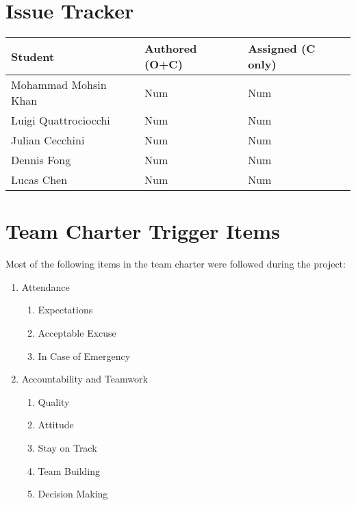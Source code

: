 \documentclass{article}
\begin{document}
\section{Issue Tracker}


\begin{table}[H]
\centering
\begin{tabular}{lll}
\toprule
\textbf{Student} & \textbf{Authored (O+C)} & \textbf{Assigned (C only)}\\
\midrule
Mohammad Mohsin Khan & Num & Num \\
Luigi Quattrociocchi & Num & Num \\
Julian Cecchini & Num & Num \\
Dennis Fong & Num & Num \\
Lucas Chen & Num & Num \\
\bottomrule
\end{tabular}
\end{table}


\section{Team Charter Trigger Items}

Most of the following items in the team charter were followed during the project:
\begin{enumerate}
    \item Attendance
    \begin{enumerate}
        \item Expectations
        \item Acceptable Excuse
        \item In Case of Emergency
    \end{enumerate}
    \item Accountability and Teamwork
    \begin{enumerate}
        \item Quality
        \item Attitude
        \item Stay on Track
        \item Team Building
        \item Decision Making
    \end{enumerate}
\end{enumerate}
\end{document}

